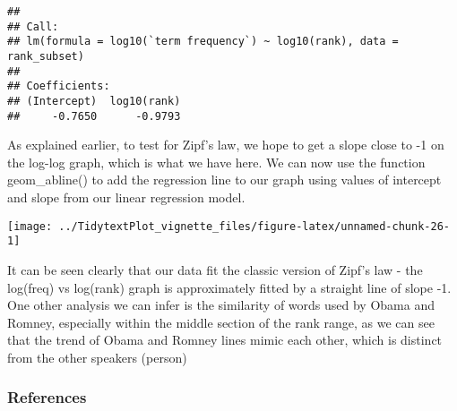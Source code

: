 \documentclass[
]{article}
\newenvironment{Shaded}{\begin{snugshade}}{\end{snugshade}}
\newcommand{\DataTypeTok}[1]{\textcolor[rgb]{0.13,0.29,0.53}{#1}}
\newcommand{\DecValTok}[1]{\textcolor[rgb]{0.00,0.00,0.81}{#1}}
\newcommand{\FloatTok}[1]{\textcolor[rgb]{0.00,0.00,0.81}{#1}}
\newcommand{\KeywordTok}[1]{\textcolor[rgb]{0.13,0.29,0.53}{\textbf{#1}}}
\newcommand{\NormalTok}[1]{#1}
\newcommand{\OperatorTok}[1]{\textcolor[rgb]{0.81,0.36,0.00}{\textbf{#1}}}
\newcommand{\OtherTok}[1]{\textcolor[rgb]{0.56,0.35,0.01}{#1}}
\newcommand{\StringTok}[1]{\textcolor[rgb]{0.31,0.60,0.02}{#1}}
\begin{document}
\begin{verbatim}
## 
## Call:
## lm(formula = log10(`term frequency`) ~ log10(rank), data = rank_subset)
## 
## Coefficients:
## (Intercept)  log10(rank)  
##     -0.7650      -0.9793
\end{verbatim}

As explained earlier, to test for Zipf's law, we hope to get a slope
close to -1 on the log-log graph, which is what we have here. We can now
use the function geom\_abline() to add the regression line to our graph
using values of intercept and slope from our linear regression model.

\begin{Shaded}
\end{Shaded}

\begin{center}\texttt{[image: ../TidytextPlot\_vignette\_files/figure-latex/unnamed-chunk-26-1]} \end{center}

It can be seen clearly that our data fit the classic version of Zipf's
law - the log(freq) vs log(rank) graph is approximately fitted by a
straight line of slope -1. One other analysis we can infer is the
similarity of words used by Obama and Romney, especially within the
middle section of the rank range, as we can see that the trend of Obama
and Romney lines mimic each other, which is distinct from the other
speakers (person)

\hypertarget{references}{%
\subsubsection{References}\label{references}}
\end{document}
